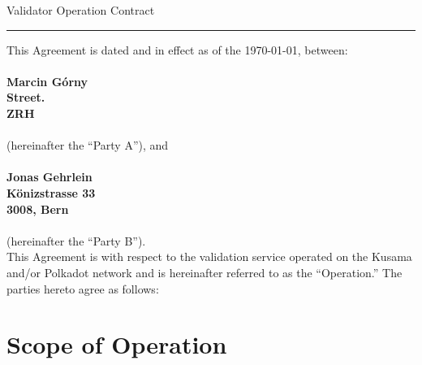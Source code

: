 \documentclass[10pt]{article}
\begin{document}
\begin{center}
{\Large Validator Operation Contract}
\end{center}

\hrule height .1mm

\vspace{.5cm}

\noindent This Agreement is dated and in effect as of the \today, between:\\
\\
{\bf Marcin Górny\\
Street.\\
ZRH\\}
\\
(hereinafter the ``Party A''), and\\
\\
{\bf Jonas Gehrlein\\
Könizstrasse 33\\
3008, Bern\\}
\\
(hereinafter the ``Party B'').  \\

This Agreement is with respect to the
validation service operated on the Kusama and/or Polkadot  network and is hereinafter referred to as the
``Operation.'' The parties hereto agree as follows: 


\section{Scope of Operation}
\end{document}
